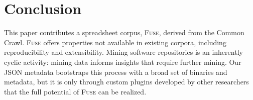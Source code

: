 \documentclass[conference]{IEEEtran}
\begin{document}


\section{Conclusion}

This paper contributes a spreadsheet corpus, \textsc{Fuse}, derived from the Common Crawl. \textsc{Fuse} offers properties not available in existing corpora, including reproducibility and extensibility. Mining software repositories is an inherently cyclic activity: mining data informs insights that require further mining. Our JSON metadata bootstraps this process with a broad set of binaries and metadata, but it is only through custom plugins developed by other researchers that the full potential of \textsc{Fuse} can be realized.



\end{document}
